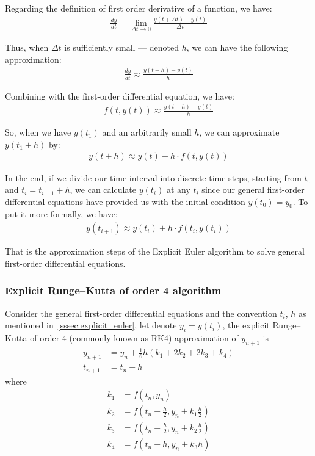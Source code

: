 \documentclass[a4paper]{article}
\numberwithin{equation}{section}
\begin{document}
Regarding the definition of first order derivative of a function, we have:
\begin{align*}
  \frac{dy}{dt} = \lim_{\Delta t \rightarrow 0} \frac{y(t + \Delta t) - y(t)}{\Delta t}
\end{align*}

Thus, when \( \Delta t \) is sufficiently small --- denoted \( h \), we can have the following approximation:
\begin{align*}
  \frac{dy}{dt} \approx \frac{y(t + h) - y(t)}{h}
\end{align*}

Combining with the first-order differential equation, we have:
\begin{align*}
  f(t,y(t)) \approx \frac{y(t + h) - y(t)}{h}
\end{align*}

So, when we have \( y(t_1) \) and an arbitrarily small \( h \), we can approximate \( y(t_1 + h) \) by:
\begin{align*}
  y(t + h) \approx y(t) + h \cdot f(t,y(t))
\end{align*}

In the end, if we divide our time interval into discrete time steps, starting from \( t_0 \) and \( t_i = t_{i-1} + h \), we can calculate \( y(t_i) \) at any \( t_i \) since our general first-order differential equations have provided us with the initial condition \( y(t_0) = y_0 \). To put it more formally, we have:
\begin{align*}
  y(t_{i+1}) \approx y(t_i) + h \cdot f(t_i, y(t_i))
\end{align*}

That is the approximation steps of the Explicit Euler algorithm to solve general first-order differential equations.

\subsubsection{Explicit Runge–Kutta of order 4 algorithm}
Consider the general first-order differential equations and the convention \( t_i \), \( h \) as mentioned in~\ref{sssec:explicit_euler}, let denote \( y_i = y(t_i) \), the explicit Runge–Kutta of order 4 (commonly known as RK4) approximation of \( y_{n+1} \) is
\begin{align*}
  y_{n+1} & = y_n + \frac{1}{6}h(k_1 + 2k_2 + 2k_3 + k_4) \\
  t_{n+1} & = t_n + h
\end{align*}
where
\begin{align*}
  k_1 & = f(t_n, y_n)                                            \\
  k_2 & = f \left(t_n + \frac{h}{2}, y_n + k_1\frac{h}{2}\right) \\
  k_3 & = f \left(t_n + \frac{h}{2}, y_n + k_2\frac{h}{2}\right) \\
  k_4 & = f(t_n + h, y_n + k_3h)
\end{align*}
\end{document}
